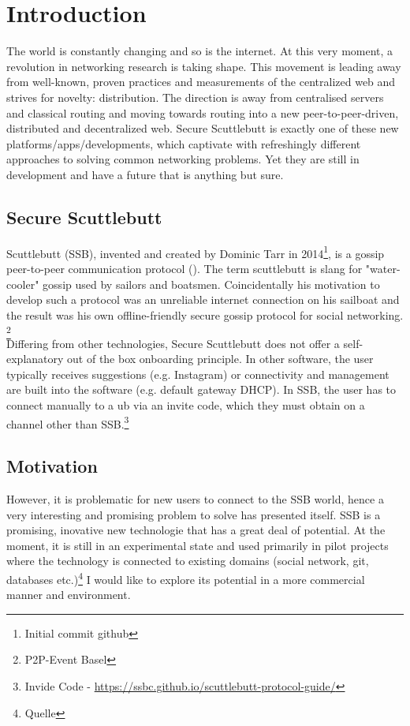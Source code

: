 \chapter{Introduction}
The world is constantly changing and so is the internet. At this very moment, a revolution in networking research is taking shape. This movement is leading away from well-known, proven practices and measurements of the centralized web and strives for novelty: distribution. The direction is away from centralised servers and classical routing and moving towards routing into a new peer-to-peer-driven, distributed and decentralized web. Secure Scuttlebutt is exactly one of these new platforms/apps/developments, which captivate with refreshingly different approaches to solving common networking problems. Yet they are still in development and have a future that is anything but sure. 
\section{Secure Scuttlebutt}
Scuttlebutt (SSB), invented and created by Dominic Tarr in 2014\footnote{Initial commit github}, is a gossip peer-to-peer communication protocol (\citet{tarr2019secure}). The term scuttlebutt is slang for "water-cooler" gossip used by sailors and boatsmen. Coincidentally his motivation to develop such a protocol was an unreliable internet connection on his sailboat and the result was his own offline-friendly secure gossip protocol for social networking. \footnote{P2P-Event Basel}\\

Differing from other technologies, Secure Scuttlebutt does not offer a self-explanatory out of the box onboarding principle. In other software, the user typically receives suggestions (e.g. Instagram) or connectivity and management are built into the software (e.g. default gateway DHCP). In SSB, the user has to connect manually to a ub via an invite code, which they must obtain on a channel other than SSB.\footnote{Invide Code - \url{https://ssbc.github.io/scuttlebutt-protocol-guide/}} 

\section{Motivation}
However, it is problematic for new users to connect to the SSB world, hence a very interesting and promising problem to solve has presented itself. SSB is a promising, inovative new technologie that has a great deal of potential. At the moment, it is still in an experimental state and used primarily in pilot projects where the technology is connected to existing domains (social network, git, databases etc.)\footnote{Quelle} I would like to explore its potential in a more commercial manner and environment. 

